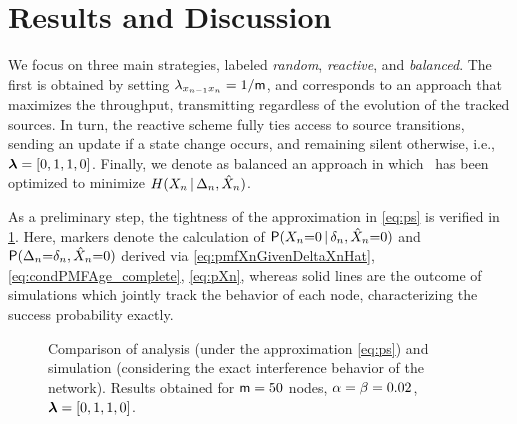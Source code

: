 \section{Results and Discussion}
\label{sec:results}

We focus on three main strategies, labeled \emph{random}, \emph{reactive}, and \emph{balanced}. The first is obtained by setting $\lambda_{x_{n-1}x_n} = 1/\mathsf m$, and corresponds to an approach that maximizes the throughput, transmitting regardless of the evolution of the tracked sources. In turn, the reactive scheme fully ties access to source transitions, sending an update if a state change occurs, and remaining silent otherwise, i.e., $\bm{\lambda}=[0,1,1,0]$. Finally, we denote as balanced an approach in which \pTxVec\ has been optimized to minimize $H(X_n\, | \,\Delta_n,\hat{X}_n)$.

As a preliminary step, the tightness of the approximation in \eqref{eq:ps} is verified in \figr\ref{fig:prob_verification}. Here, markers denote the calculation of \mbox{$\mathsf P(X_n{=}0\, | \,\delta_n,\hat{X}_n{=}0)$} and $\mathsf P(\Delta_n{=}\delta_n,\hat{X}_n{=}0)$ derived via \eqref{eq:pmfXnGivenDeltaXnHat}, \eqref{eq:condPMFAge_complete}, \eqref{eq:pXn}, whereas solid lines are the outcome of simulations which jointly track the behavior of each node, characterizing the success probability exactly.

\begin{figure}
    \hspace*{.3em}
    \caption{Comparison of analysis (under the approximation \eqref{eq:ps}) and simulation (considering the exact interference behavior of the network). Results obtained for $\mathsf m=50$ nodes, $\alpha=\beta=0.02$, $\bm{\lambda} = [0,1,1,0]$.}
    \label{fig:prob_verification}
\end{figure}



